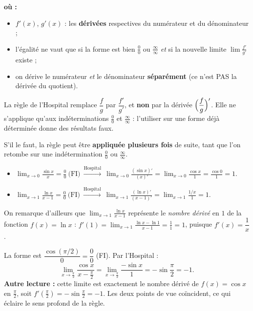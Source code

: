 \documentclass[11pt,a4paper]{article}
\newenvironment{ou}{%
  \par\smallskip\noindent\textbf{où :}\nopagebreak
  \begin{itemize}[leftmargin=1.8em,topsep=2pt,itemsep=1.5pt,parsep=0pt]}%
  {\end{itemize}}
\begin{document}
\begin{ou}
  \item $f'(x)$, $g'(x)$ : les \textbf{dérivées} respectives du numérateur et du dénominateur ;
  \item l'égalité ne vaut que si la forme est bien $\tfrac00$ ou $\tfrac{\infty}{\infty}$ \emph{et} si la nouvelle limite $\lim \tfrac{f'}{g'}$ existe ;
  \item on dérive le numérateur \emph{et} le dénominateur \textbf{séparément} (ce n'est PAS la dérivée du quotient).
\end{ou}

\begin{attention}
La règle de l'Hospital remplace $\dfrac fg$ par $\dfrac{f'}{g'}$, et \textbf{non} par la dérivée
$\Bigl(\dfrac fg\Bigr)'$. Elle ne s'applique qu'aux indéterminations $\tfrac00$ et
$\tfrac{\infty}{\infty}$ : l'utiliser sur une forme déjà déterminée donne des résultats faux.
\end{attention}

\begin{remarque}
S'il le faut, la règle peut être \textbf{appliquée plusieurs fois} de suite, tant que l'on retombe
sur une indétermination $\tfrac00$ ou $\tfrac{\infty}{\infty}$.
\end{remarque}

\begin{exemple}
\begin{itemize}[leftmargin=1.6em,topsep=2pt,itemsep=6pt]
  \item $\displaystyle\lim_{x\to 0}\frac{\sin x}{x}=\frac00\ \text{(FI)}\ \xrightarrow{\text{Hospital}}\ \lim_{x\to0}\frac{(\sin x)'}{(x)'}=\lim_{x\to 0}\frac{\cos x}{1}=\frac{\cos 0}{1}=1.$
  \item $\displaystyle\lim_{x\to 1}\frac{\ln x}{x-1}=\frac00\ \text{(FI)}\ \xrightarrow{\text{Hospital}}\ \lim_{x\to1}\frac{(\ln x)'}{(x-1)'}=\lim_{x\to 1}\frac{1/x}{1}=1.$
\end{itemize}
On remarque d'ailleurs que $\displaystyle\lim_{x\to 1}\frac{\ln x}{x-1}$ représente le \emph{nombre
dérivé} en $1$ de la fonction $f(x)=\ln x$ : $f'(1)=\displaystyle\lim_{x\to1}\frac{\ln x-\ln 1}{x-1}=\frac11=1$, puisque $f'(x)=\dfrac1x$.
\end{exemple}

\begin{exemple}
La forme est $\dfrac{\cos(\pi/2)}{0}=\dfrac00$ (FI). Par l'Hospital :
\[ \lim_{x\to\frac{\pi}{2}}\frac{\cos x}{x-\frac{\pi}{2}}=\lim_{x\to\frac{\pi}{2}}\frac{-\sin x}{1}=-\sin\frac{\pi}{2}=-1. \]
\textbf{Autre lecture :} cette limite est exactement le nombre dérivé de $f(x)=\cos x$ en
$\frac{\pi}{2}$, soit $f'\!\left(\frac{\pi}{2}\right)=-\sin\frac{\pi}{2}=-1$. Les deux points de vue
coïncident, ce qui éclaire le sens profond de la règle.
\end{exemple}
\end{document}
